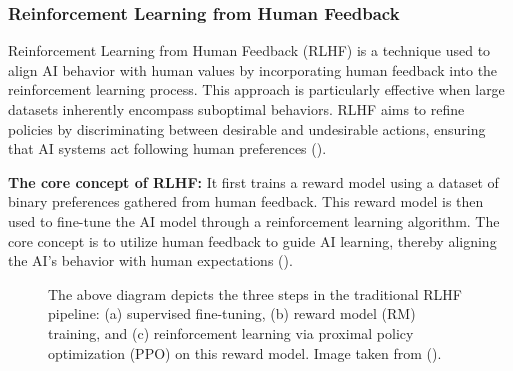 \documentclass[
  letterpaper,
  numbers=noenddot,
  DIV=11,
  oneside]{scrreprt}
\theoremstyle{remark}
\begin{document}
\subsubsection{Reinforcement Learning from Human
Feedback}\label{reinforcement-learning-from-human-feedback}

Reinforcement Learning from Human Feedback (RLHF) is a technique used to
align AI behavior with human values by incorporating human feedback into
the reinforcement learning process. This approach is particularly
effective when large datasets inherently encompass suboptimal behaviors.
RLHF aims to refine policies by discriminating between desirable and
undesirable actions, ensuring that AI systems act following human
preferences ().

\textbf{The core concept of RLHF:} It first trains a reward model using
a dataset of binary preferences gathered from human feedback. This
reward model is then used to fine-tune the AI model through a
reinforcement learning algorithm. The core concept is to utilize human
feedback to guide AI learning, thereby aligning the AI's behavior with
human expectations ().

\begin{figure}


\caption{\label{fig-toy0}The above diagram depicts the three steps in
the traditional RLHF pipeline: (a) supervised fine-tuning, (b) reward
model (RM) training, and (c) reinforcement learning via proximal policy
optimization (PPO) on this reward model. Image taken from
().}

\end{figure}%
\end{document}
